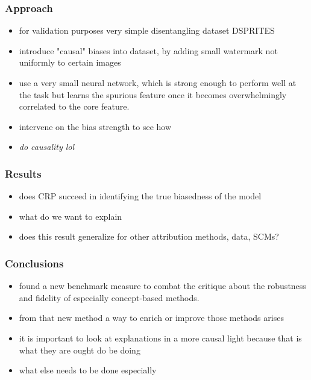 \subsubsection*{Approach}
\begin{itemize}
    \item for validation purposes very simple disentangling dataset DSPRITES
    \item introduce "causal" biases into dataset, by adding small watermark not uniformly to certain images %
    \item use a very small neural network, which is strong enough to perform well at the task but learns the spurious feature once it becomes overwhelmingly correlated to the core feature.
    \item intervene on the bias strength to see how 
    \item \textit{do causality lol}
\end{itemize}

\subsubsection*{Results}
\begin{itemize}
    \item does CRP succeed in identifying the true biasedness of the model
    \item what do we want to explain %
    \item does this result generalize for other attribution methods, data, SCMs?
\end{itemize}

\subsubsection*{Conclusions}
\begin{itemize}
    \item found a new benchmark measure to combat the critique about the robustness and fidelity of especially concept-based methods. %
    \item from that new method a way to enrich or improve those methods arises %
    \item it is important to look at explanations in a more causal light because that is what they are ought do be doing
    \item what else needs to be done especially
\end{itemize}
